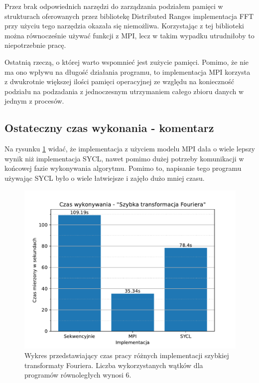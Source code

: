 \documentclass[a4paper,12pt]{book} %
\begin{document}
Przez brak odpowiednich narzędzi do zarządzania podziałem pamięci w strukturach oferowanych przez bibliotekę Distributed Ranges implementacja FFT przy użyciu tego narzędzia okazała się niemożliwa. Korzystając z tej biblioteki można równocześnie używać funkcji z MPI, lecz w takim wypadku utrudniłoby to niepotrzebnie pracę.

Ostatnią rzeczą, o której warto wspomnieć jest zużycie pamięci. Pomimo, że nie ma ono wpływu na długość działania programu, to implementacja MPI korzysta z dwukrotnie większej ilości pamięci operacyjnej ze względu na konieczność podziału na podzadania z jednoczesnym utrzymaniem całego zbioru danych w jednym z procesów.

\subsection{Ostateczny czas wykonania - komentarz}
Na rysunku \ref{fig:wykonanie-fft} widać, że implementacja z użyciem modelu MPI dała o wiele lepszy wynik niż implementacja SYCL, nawet pomimo dużej potrzeby komunikacji w końcowej fazie wykonywania algorytmu. Pomimo to, napisanie tego programu używając SYCL było o wiele łatwiejsze i zajęło dużo mniej czasu.

\begin{figure}
	\centering
	\includegraphics[scale=0.8]{assets/czas_wykonania_fft.pdf}
	\caption{Wykres przedstawiający czas pracy różnych implementacji szybkiej transformaty Fouriera. Liczba wykorzystanych wątków dla programów równoległych wynosi 6.}
	\label{fig:wykonanie-fft}
\end{figure}
\end{document}
